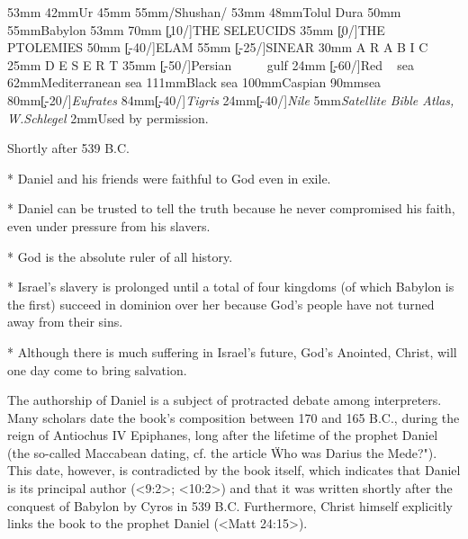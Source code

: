 {  \town 47.5mm 53mm
  \puttext 110mm 42mm{Ur}
  \town 111mm 45mm
  \puttext 122mm 55mm{\x/Shushan/}
  \town 121.5mm 53mm
  \puttext 88mm 48mm{Tolul Dura}
  \town 100.75mm 50mm
  \puttext 92mm 55mm{Babylon}
  \town 101.5mm 53mm
  \Heros {}\rm
  \puttext 62mm 70mm {\c[10/\kern7pt]{THE SELEUCIDS}}
  \puttext 2mm 35mm  {\c[0/\kern3pt]{THE PTOLEMIES}}
  \Heros {}\rm
  \puttext 130mm 50mm {\c[-40/\kern4pt]{ELAM}}
  \puttext 103mm 55mm {\c[-25/\kern4pt]{SINEAR}}
  \puttext 50mm 30mm {A R A B I C}
  \puttext 55mm 25mm {D E S E R T}
  \puttext 126mm 35mm {\c[-50/\kern1pt]{{\bi Persian ~ ~ ~ gulf}}}  
  \puttext 42mm 24mm {\c[-60/\kern1pt]{{\bi Red ~ sea}}}  
  \puttext 5mm 62mm{{\bi Mediterranean sea}}
  \puttext 62mm 111mm{{\bi Black sea}}
  \puttext 130mm 100mm{{\bi Caspian}}
  \puttext 132mm 90mm{{\bi sea}}
  \puttext 70mm 80mm{\c[-20/\kern1pt]{\it Eufrates}}
  \puttext 92mm 84mm{{\c[-40/\kern1pt]{\it Tigris}}}
      \puttext 28mm 24mm{{\c[-40/\kern1pt]{\it Nile}}}
      \puttext 2mm 5mm{{\Heros {}\it Satellite Bible Atlas,\/ \rm W.Schlegel}}
  \puttext 2mm 2mm{\Heros {}\rm Used by permission.}
  }

 Shortly after 539 B.C.


\begitems
* Daniel and his friends were faithful to God even in exile.

* Daniel can be trusted to tell the truth because he never compromised his faith, even under pressure from his slavers.

* God is the absolute ruler of all history.

* Israel's slavery is prolonged until a total of four kingdoms (of which Babylon is the first) succeed in dominion over her because God's people have not turned away from their sins. 

* Although there is much suffering in Israel's future, God's Anointed, Christ, will one day come to bring salvation.



\enditems



The authorship of Daniel is a subject of protracted debate among interpreters.
Many scholars date the book's composition between 170 and 165 B.C., during the reign of Antiochus IV Epiphanes, long after the lifetime of the prophet Daniel (the so-called {Maccabean} dating, cf. the article \"Who was Darius the Mede?"). 
This date, however, is contradicted by the book itself, which indicates that Daniel is its principal author (<9:2>; <10:2>) and that it was written shortly after the conquest of Babylon by Cyros %
in 539 B.C. Furthermore, Christ himself explicitly links the book to the prophet Daniel (<Matt 24:15>).

